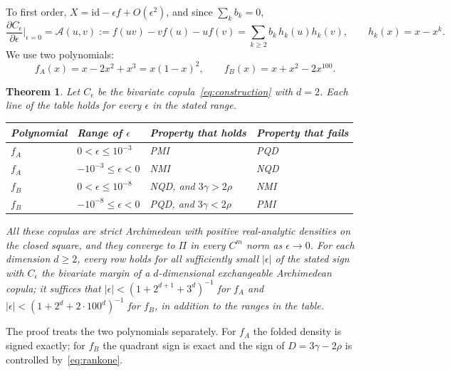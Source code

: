 \documentclass[11pt,a4paper]{article}
\newtheorem{theorem}{Theorem}[section]
\theoremstyle{remark}
\begin{document}
To first order, $X=\mathrm{id}-\epsilon f+O(\epsilon^2)$, and since $\sum_kb_k=0$,
\begin{equation}
 \frac{\partial C_\epsilon}{\partial\epsilon}\Big|_{\epsilon=0}=\mathcal A(u,v):=f(uv)-vf(u)-uf(v)=\sum_{k\geq2}b_k\,h_k(u)h_k(v),\qquad h_k(x)=x-x^k.\label{eq:tangent}
\end{equation}
We use two polynomials:
\[
 f_A(x)=x-2x^2+x^3=x(1-x)^2,\qquad f_B(x)=x+x^2-2x^{100}.
\]

\begin{theorem}\label{thm:local}
Let $C_\epsilon$ be the bivariate copula~\eqref{eq:construction} with $d=2$. Each line of the table holds for every $\epsilon$ in the stated range.
\begin{center}
\begin{tabular}{llll}
\toprule
Polynomial & Range of $\epsilon$ & Property that holds & Property that fails\\
\midrule
$f_A$ & $0<\epsilon\leq10^{-3}$ & PMI & PQD\\
$f_A$ & $-10^{-3}\leq\epsilon<0$ & NMI & NQD\\
$f_B$ & $0<\epsilon\leq10^{-8}$ & NQD, and $3\gamma>2\rho$ & NMI\\
$f_B$ & $-10^{-8}\leq\epsilon<0$ & PQD, and $3\gamma<2\rho$ & PMI\\
\bottomrule
\end{tabular}
\end{center}
All these copulas are strict Archimedean with positive real-analytic densities on the closed square, and they converge to $\Pi$ in every $C^m$ norm as $\epsilon\to0$. For each dimension $d\geq2$, every row holds for all sufficiently small $|\epsilon|$ of the stated sign with $C_\epsilon$ the bivariate margin of a $d$-dimensional exchangeable Archimedean copula; it suffices that $|\epsilon|<(1+2^{d+1}+3^d)^{-1}$ for $f_A$ and $|\epsilon|<(1+2^d+2\cdot100^d)^{-1}$ for $f_B$, in addition to the ranges in the table.
\end{theorem}

The proof treats the two polynomials separately. For $f_A$ the folded density is signed exactly; for $f_B$ the quadrant sign is exact and the sign of $D=3\gamma-2\rho$ is controlled by~\eqref{eq:rankone}.
\end{document}
